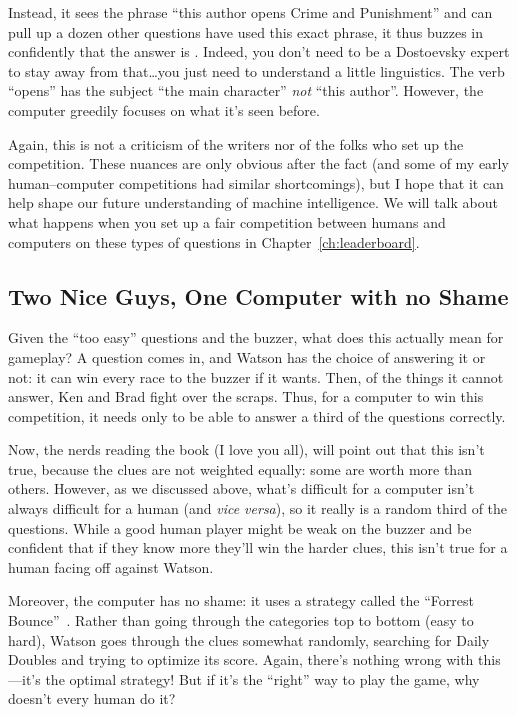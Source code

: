 Instead, it sees the phrase ``this author opens Crime and Punishment''
and can pull up a dozen other questions have used this exact phrase,
it thus buzzes in confidently that the answer is .
%
Indeed, you don't need to be a Dostoevsky expert to stay away from
that\dots you just need to understand a little linguistics.
%
The verb ``opens'' has the subject ``the main character'' \emph{not}
``this author''.
%
However, the computer greedily focuses on what it's seen before.

Again, this is not a criticism of the \jeopardy{} writers nor of the
 folks who set up the competition.
%
These nuances are only obvious after the fact (and some of my early
human--computer competitions had similar shortcomings), but I hope
that it can help shape our future understanding of machine
intelligence.
%
We will talk about what happens when you set up a fair competition between
humans and computers on these types of questions in
Chapter~\ref{ch:leaderboard}.

\subsection{Two Nice Guys, One Computer with no Shame}

Given the ``too easy'' questions and the buzzer, what does this
actually mean for gameplay?
%
A question comes in, and Watson has the choice of answering it or not:
it can win every race to the buzzer if it wants.
%
Then, of the things it cannot answer, Ken and Brad fight over the
scraps.
%
Thus, for a computer to win this competition, it needs only to be able
to answer a third of the questions correctly.

Now, the \jeopardy{} nerds reading the book (I love you all), will
point out that this isn't true, because the clues are not weighted
equally: some are worth more than others.
%
However, as we discussed above, what's difficult for a computer isn't
always difficult for a human (and \textit{vice versa}), so it really
is a random third of the questions.
%
While a good human player might be weak on the buzzer and be confident
that if they know more they'll win the harder clues, this isn't true
for a human facing off against Watson.

Moreover, the computer has no shame: it uses a strategy called the
``Forrest Bounce''~\citep[more infamously associated with James Holzhauer
and Arthur Chu]{rogak-20}.
%
Rather than going through the categories top to bottom (easy to hard),
Watson goes through the clues somewhat randomly, searching for Daily
Doubles and trying to optimize its score.
%
Again, there's nothing wrong with this---it's the optimal strategy!
%
But if it's the ``right'' way to play the game, why doesn't every
human do it?

